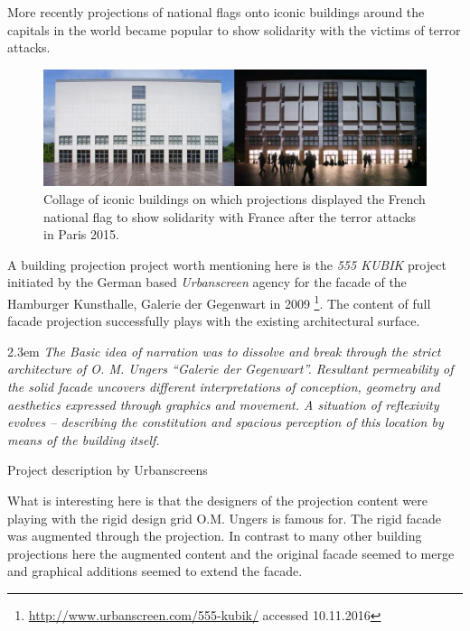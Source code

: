 More recently projections of national flags onto iconic buildings around the capitals in the world became popular to show solidarity with the victims of terror attacks.


\begin{figure}[htp]
\centering
\includegraphics[width=\textwidth]{Illustrations/Ungers_day_night.jpg}
\caption{Collage of iconic buildings on which projections displayed the French national flag to show solidarity with France after the terror attacks in Paris 2015.}
\label{NationalFlags}
\end{figure}


A building projection project worth mentioning here is the \textit{555 KUBIK}  project initiated by the German based \textit{Urbanscreen} agency for the facade of the Hamburger Kunsthalle, Galerie der Gegenwart in 2009 \footnote{\url{http://www.urbanscreen.com/555-kubik/} accessed 10.11.2016}. The content of full facade projection successfully plays with the existing architectural surface.  


\begin{singlespace}
	\leftskip2.3em
		\rightskip\leftskip
\textit{\small The Basic idea of narration was to dissolve and break through the strict architecture of O. M. Ungers “Galerie der Gegenwart”.
Resultant permeability of the solid facade uncovers different interpretations of conception, geometry and aesthetics expressed through graphics and movement. A situation of reflexivity evolves – describing the constitution and spacious perception of this location by means of the building itself.} 

\small Project description by Urbanscreens
\end{singlespace}


What is interesting here is that the designers of the projection content were playing with the rigid design grid O.M. Ungers is famous for. The rigid facade was augmented through the projection. In contrast to many other building projections here the augmented content and the original facade seemed to merge and graphical additions seemed to extend the facade.


